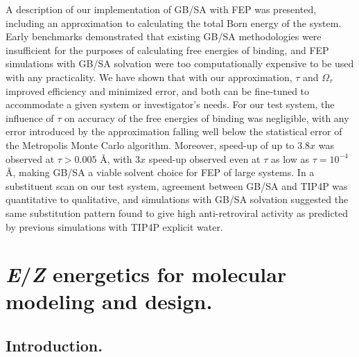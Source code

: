 \documentclass[12pt]{report}
\begin{document}
A description of our implementation of GB/SA with FEP was presented, including an approximation to calculating the total Born energy of the system. Early benchmarks demonstrated that existing GB/SA methodologies were insufficient for the purposes of calculating free energies of binding, and FEP simulations with GB/SA solvation were too computationally expensive to be used with any practicality. We have shown that with our approximation, $\tau$ and $\Omega_\tau$ improved efficiency and minimized error, and both can be fine-tuned to accommodate a given system or investigator's needs. For our test system, the influence of $\tau$ on accuracy of the free energies of binding was negligible, with any error introduced by the approximation falling well below the statistical error of the Metropolis Monte Carlo algorithm. Moreover, speed-up of up to $3.8x$ was observed at $\tau > 0.005$ \AA, with $3x$ speed-up observed even at $\tau$ as low as $\tau = 10^{-4}$ \AA, making GB/SA a viable solvent choice for FEP of large systems. In a substituent scan on our test system, agreement between GB/SA and TIP4P was quantitative to qualitative, and simulations with GB/SA solvation suggested the same substitution pattern found to give high anti-retroviral activity as predicted by previous simulations with TIP4P explicit water.


\chapter{\textit{E}/\textit{Z} energetics for molecular modeling and design.}
\label{ch-ez}

\section{Introduction.}
\end{document}
